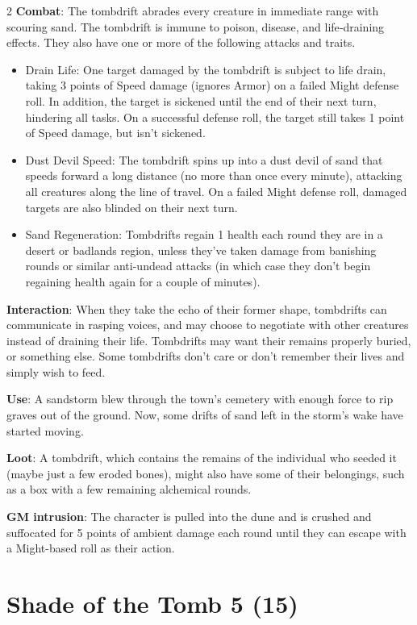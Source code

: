 \begin{multicols}{2}
\textbf{Combat}: The tombdrift abrades every creature in immediate range with scouring sand. The tombdrift is immune to poison, disease, and life‑draining effects. 
They also have one or more of the following attacks and traits.
\begin{itemize}
\item 	Drain Life: One target damaged by the tombdrift is subject to life drain, taking 3 points of Speed damage (ignores Armor) on a failed Might defense roll. In addition, the target is sickened until the end of their next turn, hindering all tasks. On a successful defense roll, the target still takes 1 point of Speed damage, but isn’t sickened.
\item 	Dust Devil Speed: The tombdrift spins up into a dust devil of sand that speeds forward a long distance (no more than once every minute), attacking all creatures along the line of travel. On a failed Might defense roll, damaged targets are also blinded on their next turn. 
\item 	Sand Regeneration: Tombdrifts regain 1 health each round they are in a desert or badlands region, unless they’ve taken damage from banishing rounds or similar anti-undead attacks (in which case they don’t begin regaining health again for a couple of minutes). 
\end{itemize}

\textbf{Interaction}: When they take the echo of their former shape, tombdrifts can communicate in rasping voices, and may choose to negotiate with other creatures instead of draining their life. Tombdrifts may want their remains properly buried, or something else. Some tombdrifts don’t care or don’t remember their lives and simply wish to feed. 

\textbf{Use}: A sandstorm blew through the town’s cemetery with enough force to rip graves out of the ground. Now, some drifts of sand left in the storm’s wake have started moving. 

\textbf{Loot}: A tombdrift, which contains the remains of the individual who seeded it (maybe just a few eroded bones), might also have some of their belongings, such as a box with a few remaining alchemical rounds.

\textbf{GM intrusion}: The character is pulled into the dune and is crushed and suffocated for 5 points of ambient damage each round until they can escape with a Might-based roll as their action.

\section{Shade of the Tomb 5 (15)}


\end{multicols}
